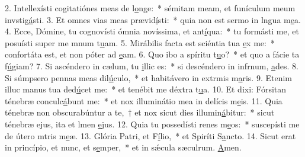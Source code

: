 2. Intellexísti cogitatiónes meas de l\uline{o}nge:~* sémitam meam, et funículum meum invstig\uline{á}sti.
3. Et omnes vias meas prævid\uline{í}sti:~* quia non est sermo in lngua m\uline{e}a.
4. Ecce, Dómine, tu cognovísti ómnia novíssima, et ant\uline{í}qua:~* tu formásti me, et posuísti super me mnum t\uline{u}am.
5. Mirábilis facta est sciéntia tua \uline{e}x me:~* confortáta est, et non póter ad \uline{e}am.
6. Quo ibo a spíritu t\uline{u}o?~* et quo a fácie ta f\uline{ú}giam?
7. Si ascéndero in cælum, tu \uline{i}llic es:~* si descéndero in infrnum, \uline{a}des.
8. Si súmpsero pennas meas dil\uline{ú}culo,~* et habitávero in extrmis m\uline{a}ris.
9. Etenim illuc manus tua ded\uline{ú}cet me:~* et tenébit me déxtra t\uline{u}a.
10. Et dixi: Fórsitan ténebræ conculc\uline{á}bunt me:~* et nox illuminátio mea in delícis m\uline{e}is.
11. Quia ténebræ non obscurabúntur a te,~† et nox sicut dies illumin\uline{á}bitur:~* sicut ténebræ ejus, ita et lmen \uline{e}jus.
12. Quia tu possedísti renes m\uline{e}os:~* suscepísti me de útero mtris m\uline{e}æ.
13. Glória Patri, et F\uline{í}lio,~* et Spiríti S\uline{a}ncto.
14. Sicut erat in princípio, et nunc, et s\uline{e}mper,~* et in sǽcula sæculrum. \uline{A}men.
